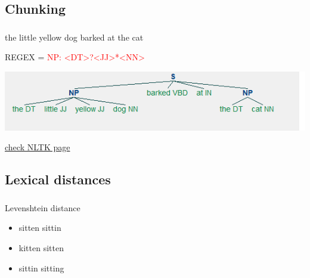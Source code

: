 \documentclass[t, 10pt]{beamer}
\begin{document}
\subsection{Chunking}
    \begin{frame} %
    	\frametitle{\insertsection}
    	\frametitle{\insertsubsection}
    	
    	the little yellow dog barked at the cat
    	
    	\vspace{0.5cm}
    	
    	REGEX  =  \textcolor{red}{NP: {<DT>?<JJ>*<NN>} } 
    	
    	\vspace{0.5cm}
    	
 		\includegraphics[width=0.7\linewidth]{ch.png}
 		
 		\vspace{0.5cm}
 		
 	\textcolor{black}{\small{\href{https://pythonprogramming.net/chunking-nltk-tutorial/}{check NLTK page}} }
    
	\end{frame}	

\subsection{Lexical distances}
    \begin{frame} %
	\frametitle{\insertsection}
	\frametitle{\insertsubsection}
	 
		 Levenshtein distance
	
	\begin{itemize}
		\item sitten \MVRightarrow { }sittin
		\item kitten \MVRightarrow { }sitten
		\item sittin \MVRightarrow { }sitting 
	\end{itemize}
	
\end{frame}	%
\end{document}
